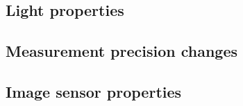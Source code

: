 \subsection{Light properties}
\subsection{Measurement precision changes}
\subsection{Image sensor properties}

